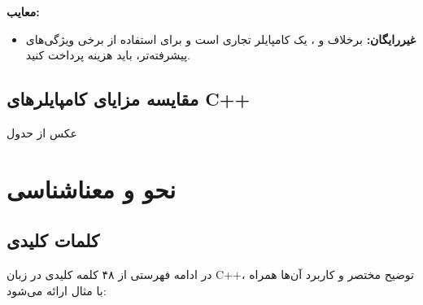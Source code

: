 \documentclass[12pt, a4paper]{report}
\begin{document}
\textbf{معایب:}
\begin{itemize}
	\item \textbf{غیررایگان:} برخلاف  و ،  یک کامپایلر تجاری است و برای استفاده از برخی ویژگی‌های پیشرفته‌تر، باید هزینه پرداخت کنید.
\end{itemize}

\section{مقایسه مزایای کامپایلرهای C++}
عکس از حدول
\chapter{نحو و معناشناسی}
\section{کلمات کلیدی}
در ادامه فهرستی از ۴۸ کلمه کلیدی در زبان C++، توضیح مختصر و کاربرد آن‌ها همراه با مثال ارائه می‌شود:
\end{document}
